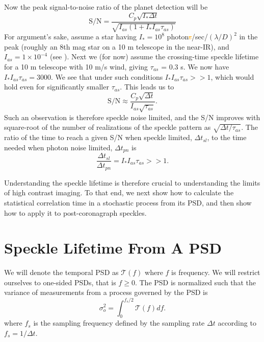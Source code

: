 \documentclass[10pt,preprint]{aastex631}
\newcommand{\ogrmv}[1]{\textcolor{orange}{\sout{#1}}}
\begin{document}
Now the peak signal-to-noise ratio of the planet detection will be
\begin{equation}
\mbox{S/N} = \frac{C_p \sqrt{I_* \Delta t}}{ \sqrt{I_{as} (1 + I_*I_{as} \tau_{as})}} 
\end{equation}
For argument's sake, assume a star having $I_* = 10^8$ photon\ogrmv{s}/sec/$(\lambda/D)^2$ in the peak (roughly an 8th mag star on a 10 m telescope in the near-IR), and $I_{as} = 1\times10^{-4}$ (see \citet{2018JATIS...4a9001M}).  Next we (for now) assume the \citet{2005SPIE.5903..170M} crossing-time speckle lifetime for a 10 m telescope with 10 m/s wind, giving $\tau_{as}$ = 0.3 s.  We now have $I_*I_{as} \tau_{as} = 3000$.  We see that under such conditions  $I_*I_{as} \tau_{as} >> 1$, which would hold even for significantly smaller $\tau_{as}$.  This leads us to
\begin{equation}
\mbox{S/N} \approx \frac{C_p \sqrt{\Delta t}}{ I_{as} \sqrt{\tau_{as}}}. 
\end{equation}
Such an observation is therefore speckle noise limited, and the S/N improves with square-root of the number of realizations of the speckle pattern as $\sqrt{\Delta t/ \tau_{as}}$.  The ratio of the time to reach a given S/N when speckle limited, $\Delta t_{sl}$, to the time needed when photon noise limited, $\Delta t_{pn}$ is
\begin{equation}
\frac{\Delta t_{sl}}{\Delta t_{pn}} = I_*I_{as} \tau_{as} >> 1.
\label{eqn:relexptime}
\end{equation}

Understanding the speckle lifetime is therefore crucial to understanding the limits of high contrast imaging.  To that end, we next show how to calculate the statistical correlation time in a stochastic process from its PSD, and then show how to apply it to post-coronagraph speckles.


\section{Speckle Lifetime From A PSD}
\label{sec:psd_lifetime}
We will denote the temporal PSD as $\mathcal{T}(f)$ where $f$ is frequency.  We will restrict ourselves to one-sided PSDs, that is $f \ge 0$.  The PSD is normalized such that the variance of measurements from a process governed by the PSD is
\begin{equation}
\sigma_o^2 = \int_{0}^{f_s/2} \mathcal{T}(f) df.
\label{eqn:process_var}
\end{equation}
where $f_s$ is the sampling frequency defined by the sampling rate $\Delta t$ according to $f_s = 1/\Delta t$.
\end{document}
